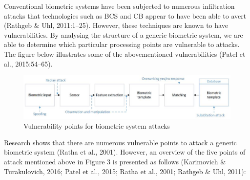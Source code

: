     Conventional biometric systems have been subjected to numerous infiltration attacks that technologies such as BCS and CB appear to have been able to avert (Rathgeb \& Uhl, 2011:1–25). However, these techniques are known to have vulnerabilities. By analysing the structure of a generic biometric system, we are able to determine which particular processing points are vulnerable to attacks. The figure below illustrates some of the abovementioned vulnerabilities (Patel et al., 2015:54–65).
    
    
    \begin{figure}[htbp!] 
    \centering    
    \includegraphics[width=1.0\textwidth]{Chapter2/Figs/Vulnerability_points_for_biometric_system_attacks.jpg}
    \caption[Vulnerability points for biometric system attacks]{Vulnerability points for biometric system attacks}
    \label{fig:Vulnerability points for biometric system attacks}
    \end{figure}
    
    Research shows that there are numerous vulnerable points to attack a generic biometric system (Ratha et al., 2001). However, an overview of the five points of attack mentioned above in Figure 3 is presented as follows (Karimovich \& Turakulovich, 2016; Patel et al., 2015; Ratha et al., 2001; Rathgeb \& Uhl, 2011):
    

